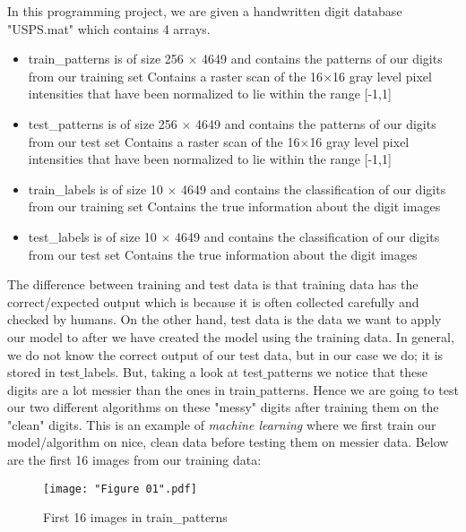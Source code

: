 \documentclass[final,12pt,reqno]{amsart}
\begin{document}
In this programming project, we are given a handwritten digit database "USPS.mat" which contains 4 arrays.
\begin{itemize}
  \item train\_patterns is of size 256 $\times$ 4649 and contains the patterns of our digits from our training set
  \subitem Contains a raster scan of the 16$\times$16 gray level pixel intensities that have been normalized to 
  \subitem lie within the range [-1,1]
  \item test\_patterns is of size 256 $\times$ 4649 and contains the patterns of our digits from our test set
  \subitem Contains a raster scan of the 16$\times$16 gray level pixel intensities that have been normalized to 
  \subitem lie within the range [-1,1]
  \item train\_labels is of size 10 $\times$ 4649 and contains the classification of our digits from our training set
  \subitem Contains the true information about the digit images
  \item test\_labels is of size 10 $\times$ 4649 and contains the classification of our digits from our test set
  \subitem Contains the true information about the digit images
\end{itemize}
The difference between training and test data is that training data has the correct/expected output which is because it is often collected carefully and checked by humans. On the other hand, test data is the data we want to apply our model to after we have created the model using the training data. In general, we do not know the correct output of our test data, but in our case we do; it is stored in test$\_$labels. But, taking a look at test$\_$patterns we notice that these digits are a lot messier than the ones in train$\_$patterns. Hence we are going to test our two different algorithms on these "messy" digits after training them on the "clean" digits. This is an example of \textit{machine learning} where we first train our model/algorithm on nice, clean data before testing them on messier data. Below are the first 16 images from our training data:

\begin{figure}[hbtp]
  \begin{center}
    \texttt{[image: "Figure 01".pdf]}
    \caption{First 16 images in train\_patterns}
  \end{center}
\end{figure}

\newpage
\end{document}
